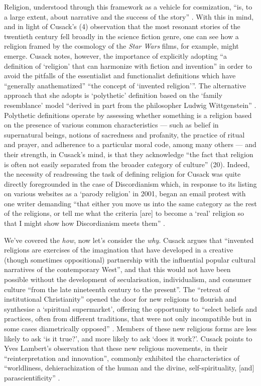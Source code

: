 \documentclass[Draft.tex]{subfiles}
\begin{document}
Religion, understood through this framework as a vehicle for cosmization,
``is, to a large extent, about narrative
and the success of the story'' \parencite[4]{Cusack10}.
With this in mind, and in light of Cusack's (4) observation
that the most resonant stories of the twentieth century
fell broadly in the science fiction genre,
one can see how a religion framed by the cosmology of
the \textit{Star Wars} films, for example, might emerge.
Cusack \parencite*[20]{Cusack10} notes, however, the importance of
explicitly adopting ``a definition of `religion' that can
harmonize with fiction and invention'' in order to avoid the pitfalls
of the essentialist and functionalist definitions
which have ``generally anathematized'' ``the concept of `invented religion'''.
The alternative approach that she adopts is `polythetic' definition
based on the `family resemblance' model ``derived in part from the philosopher
Ludwig Wittgenstein'' \parencite[20]{Cusack10}.
Polythetic definitions operate by assessing whether something is a religion
based on the presence of various common characteristics --- such as
belief in supernatural beings, notions of sacredness and profanity,
the practice of ritual and prayer, and adherence to a particular moral code,
among many others --- and their strength, in Cusack's mind, is that
they acknowledge ``the fact that religion is often not easily separated from
the broader category of culture'' (20).
Indeed, the necessity of readressing the task of defining religion for Cusack
was quite directly foregrounded in the case of Discordianism which,
in response to its listing on various websites as a `parody religion'
in 2001, began an email protest with one writer demanding
``that either you move us into the same category
as the rest of the religions, or tell me what the criteria [are]
to become a `real' religion so that I might show
how Discordianism meets them'' \parencite[209]{Chidester05}.

We've covered the \textit{how}, now let's consider the \textit{why}.
Cusack \parencite*[7]{Cusack10} argues that ``invented religions are
exercises of the imagination that have developed in a creative
(though sometimes oppositional) partnership with the influential
popular cultural narratives of the contemporary West'',
and that this would not have been possible without
the development of secularisation, individualism, and consumer culture
``from the late nineteenth century to the present''.
The ``retreat of institutional Christianity'' opened the door
for new religions to flourish and synthesise a `spiritual supermarket',
offering the opportunity to ``select beliefs and practices,
often from different traditions, that were not only incompatible
but in some cases diametrically opposed'' \parencite[25, 17]{Cusack10}.
Members of these new religious forms are less likely to ask
`is it true?', and more likely to ask `does it work?'.
Cusack \parencite[9]{Cusack10} points to Yves Lambert's observation that
these new religious movements, in their ``reinterpretation and innovation'',
commonly exhibited the characteristics of
``worldliness, dehierachization of the human and the divine,
self-spirituality, [and] parascientificity'' \parencite[303]{Lambert99}.
\end{document}
